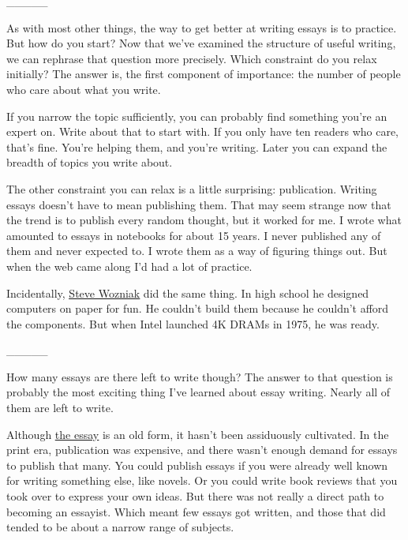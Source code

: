                  \_\_\_\_\_
                  


                  As with most other things, the way to get better at writing
                  essays is to practice. But how do you start? Now that we've
                  examined the structure of useful writing, we can rephrase that
                  question more precisely. Which constraint do you relax
                  initially? The answer is, the first component of importance:
                  the number of people who care about what you write.

If
                  you narrow the topic sufficiently, you can probably find
                  something you're an expert on. Write about that to start with.
                  If you only have ten readers who care, that's fine. You're
                  helping them, and you're writing. Later you can expand the
                  breadth of topics you write about.

The other
                  constraint you can relax is a little surprising: publication.
                  Writing essays doesn't have to mean publishing them. That may
                  seem strange now that the trend is to publish every random
                  thought, but it worked for me. I wrote what amounted to essays
                  in notebooks for about 15 years. I never published any of them
                  and never expected to. I wrote them as a way of figuring
                  things out. But when the web came along I'd had a lot of
                  practice.

Incidentally,
                  \href{http://www.foundersatwork.com/steve-wozniak.html}{\underline{Steve Wozniak}}
                  did the same thing. In high school he designed computers on
                  paper for fun. He couldn't build them because he couldn't
                  afford the components. But when Intel launched 4K DRAMs in
                  1975, he was ready.


                  \_\_\_\_\_
                  


                  How many essays are there left to write though? The answer to
                  that question is probably the most exciting thing I've learned
                  about essay writing. Nearly all of them are left to write.

Although
                  \href{http://www.paulgraham.com/essay.html}{\underline{the essay}} is an old form, it
                  hasn't been assiduously cultivated. In the print era,
                  publication was expensive, and there wasn't enough demand for
                  essays to publish that many. You could publish essays if you
                  were already well known for writing something else, like
                  novels. Or you could write book reviews that you took over to
                  express your own ideas. But there was not really a direct path
                  to becoming an essayist. Which meant few essays got written,
                  and those that did tended to be about a narrow range of
                  subjects.

